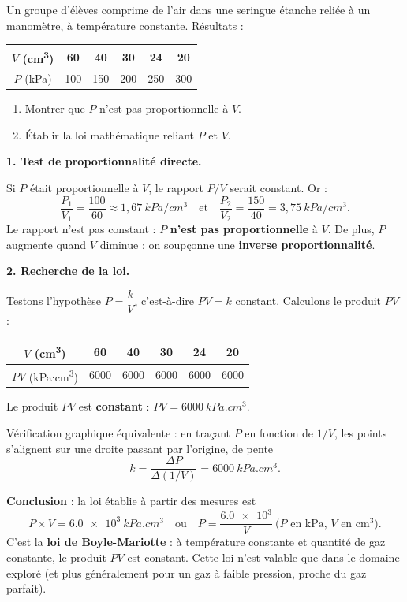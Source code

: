 \documentclass[11pt]{article}
\begin{document}
\begin{exoresolu}
Un groupe d'élèves comprime de l'air dans une seringue étanche reliée à un manomètre, à température constante. Résultats :

\begin{center}
\begin{tabular}{|c|ccccc|}
\hline
$V$ (cm\textsuperscript{3}) & 60 & 40 & 30 & 24 & 20 \\
\hline
$P$ (kPa) & 100 & 150 & 200 & 250 & 300 \\
\hline
\end{tabular}
\end{center}

\begin{enumerate}
\item Montrer que $P$ n'est pas proportionnelle à $V$.
\item Établir la loi mathématique reliant $P$ et $V$.
\end{enumerate}
\tcblower
\textbf{1. Test de proportionnalité directe.}

Si $P$ était proportionnelle à $V$, le rapport $P/V$ serait constant. Or :
\[ \dfrac{P_1}{V_1} = \dfrac{100}{60} \approx 1,67 \ \si{kPa/cm^3} \quad \text{et} \quad \dfrac{P_2}{V_2} = \dfrac{150}{40} = 3,75 \ \si{kPa/cm^3}. \]
Le rapport n'est pas constant : $P$ \textbf{n'est pas proportionnelle} à $V$. De plus, $P$ augmente quand $V$ diminue : on soupçonne une \textbf{inverse proportionnalité}.

\textbf{2. Recherche de la loi.}

Testons l'hypothèse $P = \dfrac{k}{V}$, c'est-à-dire $PV = k$ constant. Calculons le produit $PV$ :

\begin{center}
\begin{tabular}{|c|ccccc|}
\hline
$V$ (cm\textsuperscript{3}) & 60 & 40 & 30 & 24 & 20 \\
\hline
$PV$ (kPa$\cdot$cm\textsuperscript{3}) & 6000 & 6000 & 6000 & 6000 & 6000 \\
\hline
\end{tabular}
\end{center}

Le produit $PV$ est \textbf{constant} : $PV = \SI{6000}{kPa.cm^3}$.

Vérification graphique équivalente : en traçant $P$ en fonction de $1/V$, les points s'alignent sur une droite passant par l'origine, de pente
\[ k = \dfrac{\Delta P}{\Delta(1/V)} = \SI{6000}{kPa.cm^3}. \]

\textbf{Conclusion} : la loi établie à partir des mesures est
\[ P \times V = \SI{6,0e3}{kPa.cm^3} \quad \text{ou} \quad P = \dfrac{\num{6,0e3}}{V} \ \text{(}P\text{ en kPa, }V\text{ en cm}^3\text{)}. \]
C'est la \textbf{loi de Boyle-Mariotte} : à température constante et quantité de gaz constante, le produit $PV$ est constant. Cette loi n'est valable que dans le domaine exploré (et plus généralement pour un gaz à faible pression, proche du gaz parfait).
\end{exoresolu}
\end{document}
